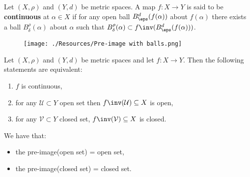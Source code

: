 \documentclass[12pt, a4paper]{article}
\begin{document}
\begin{definition}
    Let \((X,\rho)\) and \((Y,d)\) be metric spaces. A map \(f:X \to Y\) is said to be \textbf{continuous} at \(\alpha \in X\) if for any open ball \(B_{\eps}^d(f(\alpha))\) about \(f(\alpha)\) there exists a ball \(B_{\delta}^{\rho}(\alpha)\) about \(\alpha\) such that \(B_{\delta}^{\rho}(\alpha) \subset f\inv(B_{\eps}^d(f(\alpha)))\).
    \begin{figure}[H]
         \begin{center}
             \texttt{[image: ./Resources/Pre-image with balls.png]}
         \end{center}
    \end{figure}
\end{definition}

\begin{mdthm}
    Let \((X,\rho)\) and \((Y,d)\) be metric spaces and let \(f :X \to Y\). Then the following statements are equivalent:
    \begin{enumerate}
        \item \(f\) is continuous,
        \item for any \(\mathcal{U} \subset Y\) open set then \(f\inv(\mathcal{U}) \subseteq X\) is open,
        \item for any \(\mathcal{V} \subset Y\) closed set, \(f\inv(\mathcal{V}) \subseteq X\) is closed.
    \end{enumerate}
\end{mdthm}

\begin{mdnote}
    We have that: 
    \begin{itemize}
        \item the pre-image(open set) = open set,
        \item the pre-image(closed set) = closed set.
    \end{itemize}
\end{mdnote}
\end{document}
